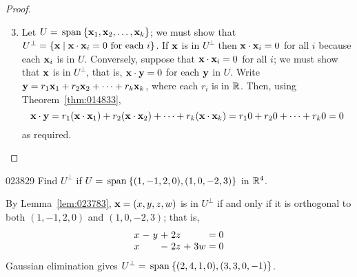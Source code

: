 \begin{proof}
\vspace{-1em}
\begin{enumerate}
\setcounter{enumi}{2}
\item Let $U = \thinspace\operatorname{span\medspace}\{\textbf{x}_{1}, \textbf{x}_{2}, \dots, \textbf{x}_{k}\}$; we must show that $U^\perp = \{\textbf{x} \mid \textbf{x} \cdot \textbf{x}_{i} = 0 \mbox{ for each } i\}$. If $\textbf{x}$ is in $U^\perp$ then $\textbf{x} \cdot \textbf{x}_{i} = 0$ for all $i$ because each $\textbf{x}_{i}$ is in $U$. Conversely, suppose that $\textbf{x} \cdot \textbf{x}_{i} = 0$ for all $i$; we must show that $\textbf{x}$ is in $U^\perp$, that is, $\textbf{x} \cdot \textbf{y} = 0$ for each $\textbf{y}$ in $U$. Write $\textbf{y} = r_{1}\textbf{x}_{1} + r_{2}\textbf{x}_{2} + \dots  + r_{k}\textbf{x}_{k}$, where each $r_{i}$ is in $\mathbb{R}$. Then, using Theorem~\ref{thm:014833}, 
\begin{equation*}
\textbf{x} \cdot \textbf{y} = r_{1}(\textbf{x} \cdot \textbf{x}_{1}) + r_{2}(\textbf{x} \cdot \textbf{x}_{2})+ \dots +r_{k}(\textbf{x} \cdot \textbf{x}_{k}) = r_{1}0 + r_{2}0 + \dots + r_{k}0 = 0
\end{equation*}
 as required.
\end{enumerate}
\vspace*{-2em}\end{proof}

\begin{example}{}{023829}
Find $U^\perp$ if $U = \thinspace\operatorname{span\medspace}\{(1, -1, 2, 0), (1, 0, -2, 3)\}$ in $\mathbb{R}^4$.

\begin{solution}
  By Lemma~\ref{lem:023783}, $\textbf{x} = (x, y, z, w)$ is in $U^\perp$ if and only if it is orthogonal to both $(1, -1, 2, 0)$ and $(1, 0, -2, 3)$; that is,
\begin{equation*}\def\arraycolsep{1.5pt}
\begin{array}{rrrrrrrr}
x & - & y & + & 2z & & & =0\\
x & & & - & 2z & +& 3w & =0
\end{array}
\end{equation*} 
Gaussian elimination gives $U^\perp = \thinspace\operatorname{span\medspace}\{(2, 4, 1, 0), (3, 3, 0, -1)\}$.
\end{solution}
\end{example}

\begin{wrapfigure}{l}{5cm} 
\centering

\end{wrapfigure}

